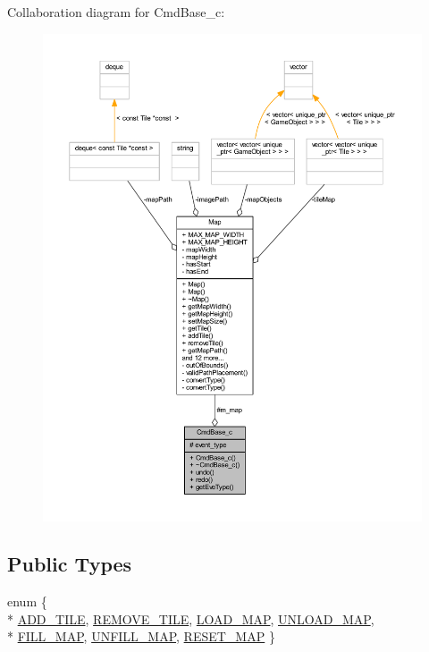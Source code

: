 Collaboration diagram for Cmd\+Base\+\_\+c\+:\nopagebreak
\begin{figure}[H]
\begin{center}
\leavevmode
\includegraphics[width=350pt]{class_cmd_base__c__coll__graph}
\end{center}
\end{figure}
\subsection*{Public Types}
\begin{DoxyCompactItemize}
\item 
enum \{ \\*
\hyperlink{class_cmd_base__c_af28adb77d1dc7716af08a63b40457889ab9e27df11c718d9e4486b0c578c6391e}{A\+D\+D\+\_\+\+T\+I\+L\+E}, 
\hyperlink{class_cmd_base__c_af28adb77d1dc7716af08a63b40457889aee12e4ac9ace8bb24ea3f2a709c1babd}{R\+E\+M\+O\+V\+E\+\_\+\+T\+I\+L\+E}, 
\hyperlink{class_cmd_base__c_af28adb77d1dc7716af08a63b40457889a7a8c2602fa5efda43ecde5bbfe76dd3c}{L\+O\+A\+D\+\_\+\+M\+A\+P}, 
\hyperlink{class_cmd_base__c_af28adb77d1dc7716af08a63b40457889a2289030417d1bf93a2124a768ec98ef8}{U\+N\+L\+O\+A\+D\+\_\+\+M\+A\+P}, 
\\*
\hyperlink{class_cmd_base__c_af28adb77d1dc7716af08a63b40457889a1ec9788e8f8abac37b35e5dbf191fd9b}{F\+I\+L\+L\+\_\+\+M\+A\+P}, 
\hyperlink{class_cmd_base__c_af28adb77d1dc7716af08a63b40457889a4281fb7c02d3a6ccc11d17a6dde0af7c}{U\+N\+F\+I\+L\+L\+\_\+\+M\+A\+P}, 
\hyperlink{class_cmd_base__c_af28adb77d1dc7716af08a63b40457889a5f227000bcb4fea713b6f37dc276e991}{R\+E\+S\+E\+T\+\_\+\+M\+A\+P}
 \}
\end{DoxyCompactItemize}
